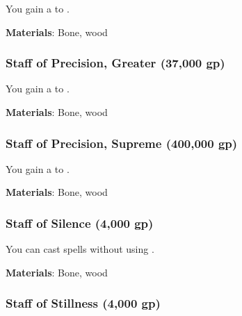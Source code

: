 You gain a   to .



\vspace{0.25em}
\textbf{Materials}: Bone, wood


\lowercase{\hypertarget{item:Staff of Precision, Greater}{}}\label{item:Staff of Precision, Greater}
\hypertarget{item:Staff of Precision, Greater}{\subsubsection{Staff of Precision, Greater\hfill{} (37,000 gp)}}

You gain a   to .



\vspace{0.25em}
\textbf{Materials}: Bone, wood


\lowercase{\hypertarget{item:Staff of Precision, Supreme}{}}\label{item:Staff of Precision, Supreme}
\hypertarget{item:Staff of Precision, Supreme}{\subsubsection{Staff of Precision, Supreme\hfill{} (400,000 gp)}}

You gain a   to .



\vspace{0.25em}
\textbf{Materials}: Bone, wood


\lowercase{\hypertarget{item:Staff of Silence}{}}\label{item:Staff of Silence}
\hypertarget{item:Staff of Silence}{\subsubsection{Staff of Silence\hfill{} (4,000 gp)}}

You can cast spells without using .



\vspace{0.25em}
\textbf{Materials}: Bone, wood


\lowercase{\hypertarget{item:Staff of Stillness}{}}\label{item:Staff of Stillness}
\hypertarget{item:Staff of Stillness}{\subsubsection{Staff of Stillness\hfill{} (4,000 gp)}}

